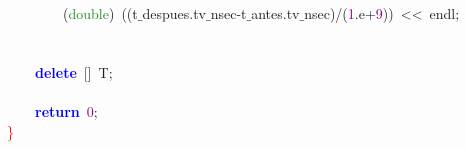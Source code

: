 \mbox{}\ \ \ \ \ \ \ \ \textcolor{BrickRed}{(}\textcolor{ForestGreen}{double}\textcolor{BrickRed}{)}\ \textcolor{BrickRed}{((}t$\_$despues\textcolor{BrickRed}{.}tv$\_$nsec\textcolor{BrickRed}{-}t$\_$antes\textcolor{BrickRed}{.}tv$\_$nsec\textcolor{BrickRed}{)/(}\textcolor{Purple}{1}\textcolor{BrickRed}{.}e\textcolor{BrickRed}{+}\textcolor{Purple}{9}\textcolor{BrickRed}{))}\ \textcolor{BrickRed}{\textless{}\textless{}}\ endl\textcolor{BrickRed}{;} \\
\mbox{} \\
\mbox{}\ \ \ \  \\
\mbox{}\ \ \ \ \textbf{\textcolor{Blue}{delete}}\ \textcolor{BrickRed}{[]}\ T\textcolor{BrickRed}{;} \\
\mbox{}\ \ \ \  \\
\mbox{}\ \ \ \ \textbf{\textcolor{Blue}{return}}\ \textcolor{Purple}{0}\textcolor{BrickRed}{;} \\
\mbox{}\textcolor{Red}{\}} \\
\mbox{}
